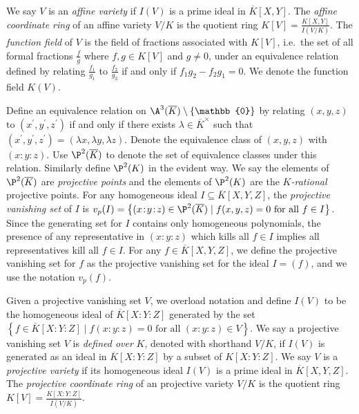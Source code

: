 \documentclass[11pt,letterpaper]{article}
\theoremstyle{definition}
\newcommand{\6}{\mathbf}
\newcommand{\7}{\mathcal}
\newcommand{\zero}{\mathbb{0}}
\begin{document}
We say $V$ is an \textit{affine variety} if $I(V)$ is a prime ideal in $\overline{K}[X,Y]$. The \textit{affine coordinate ring} of an affine variety $V/K$ is the quotient ring $K[V] = \frac{K[X,Y]}{I(V/K)}$. The \textit{function field} of $V$ is the field of fractions associated with $K[V]$, i.e.\ the set of all formal fractions $\frac{f}{g}$ where $f, g \in K[V]$ and $g \neq 0$, under an equivalence relation defined by relating $\frac{f_1}{g_1}$ to $\frac{f_2}{g_2}$ if and only if $f_1 g_2 - f_2 g_1 = 0$. We denote the function field $K(V)$.

Define an equivalence relation on $\A^3(\overline{K}) \setminus \left\{\zero\right\}$ by relating $(x,y,z)$ to $(x^\prime, y^\prime, z^\prime)$ if and only if there exists $\lambda \in \overline{K}^\times$ such that $(x^\prime, y^\prime, z^\prime) = (\lambda x, \lambda y, \lambda z)$. Denote the equivalence class of $(x,y,z)$ with $(x\!:\!y\!:\!z)$. Use $\P^2(\overline{K})$ to denote the set of equivalence classes under this relation. Similarly define $\P^2(K)$ in the evident way. We say the elements of $\P^2(\overline{K})$ are \textit{projective points} and the elements of $\P^2(K)$ are the \textit{$K$-rational} projective points. For any homogeneous ideal $I \subseteq \overline{K}[X,Y,Z]$, the \textit{projective vanishing set} of $I$ is $v_p(I) = \left\{(x\!:\!y\!:\!z) \in \P^2(\overline{K}) \mid f(x,y,z)=0\text{ for all }f \in I\right\}$. Since the generating set for $I$ contains only homogeneous polynomials, the presence of any representative in $(x\!:\!y\!:\!z)$ which kills all $f \in I$ implies all representatives kill all $f \in I$. For any $f \in \overline{K}[X,Y,Z]$, we define the projective vanishing set for $f$ as the projective vanishing set for the ideal $I=(f)$, and we use the notation $v_p(f)$.



Given a projective vanishing set $V$, we overload notation and define $I(V)$ to be the homogeneous ideal of $\overline{K}[X\!:\!Y\!:\!Z]$ generated by the set $\left\{f \in \overline{K}[X\!:\!Y\!:\!Z] \mid f(x\!:\!y\!:\!z) = 0\text{ for all }(x\!:\!y\!:\!z) \in V\right\}$.
We say a projective vanishing set $V$ is \textit{defined over} $K$, denoted with shorthand $V/K$, if $I(V)$ is generated as an ideal in $\overline{K}[X\!:\!Y\!:\!Z]$ by a subset of $K[X\!:\!Y\!:\!Z]$. 
We say $V$ is a \textit{projective variety} if its homogeneous ideal $I(V)$ is a prime ideal in $\overline{K}[X,Y,Z]$. The \textit{projective coordinate ring} of an projective variety $V/K$ is the quotient ring $K[V] = \frac{K[X\!:\!Y\!:\!Z]}{I(V/K)}$. %
\end{document}
